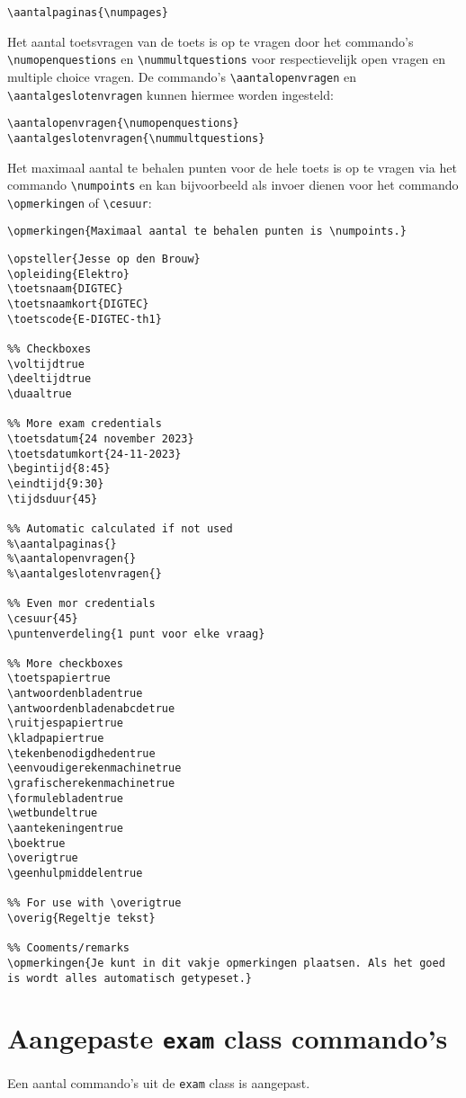 \documentclass[12pt,dutch,addpoints,fleqn]{tisdexam}
\newcommand\DocClass[1]{\texttt{#1}}
\begin{document}
\bigskip
\verb|\aantalpaginas{\numpages}|

\bigskip
Het aantal toetsvragen van de toets is op te vragen door het commando's \verb|\numopenquestions| en
\verb|\nummultquestions| voor respectievelijk open vragen en multiple choice vragen.
De commando's \verb|\aantalopenvragen| en \verb|\aantalgeslotenvragen| kunnen hiermee worden ingesteld:

\bigskip
\verb|\aantalopenvragen{\numopenquestions}| \\
\verb|\aantalgeslotenvragen{\nummultquestions}|


\bigskip
Het maximaal aantal te behalen punten voor de hele toets is op te vragen via het commando
\verb|\numpoints| en kan bijvoorbeeld als invoer dienen voor het commando \verb|\opmerkingen| of
\verb|\cesuur|:

\bigskip
\verb|\opmerkingen{Maximaal aantal te behalen punten is \numpoints.}|

\newpage

\begin{lstlisting}
\opsteller{Jesse op den Brouw}
\opleiding{Elektro}
\toetsnaam{DIGTEC}
\toetsnaamkort{DIGTEC}
\toetscode{E-DIGTEC-th1}

%% Checkboxes
\voltijdtrue
\deeltijdtrue
\duaaltrue

%% More exam credentials
\toetsdatum{24 november 2023}
\toetsdatumkort{24-11-2023}
\begintijd{8:45}
\eindtijd{9:30}
\tijdsduur{45}

%% Automatic calculated if not used
%\aantalpaginas{}
%\aantalopenvragen{}
%\aantalgeslotenvragen{}

%% Even mor credentials
\cesuur{45}
\puntenverdeling{1 punt voor elke vraag}

%% More checkboxes
\toetspapiertrue
\antwoordenbladentrue
\antwoordenbladenabcdetrue
\ruitjespapiertrue
\kladpapiertrue
\tekenbenodigdhedentrue
\eenvoudigerekenmachinetrue
\grafischerekenmachinetrue
\formulebladentrue
\wetbundeltrue
\aantekeningentrue
\boektrue
\overigtrue
\geenhulpmiddelentrue

%% For use with \overigtrue
\overig{Regeltje tekst}

%% Cooments/remarks
\opmerkingen{Je kunt in dit vakje opmerkingen plaatsen. Als het goed is wordt alles automatisch getypeset.}
\end{lstlisting}


\section{Aangepaste \DocClass{exam} class commando's}
Een aantal commando's uit de \DocClass{exam} class is aangepast.
\medskip
\end{document}
